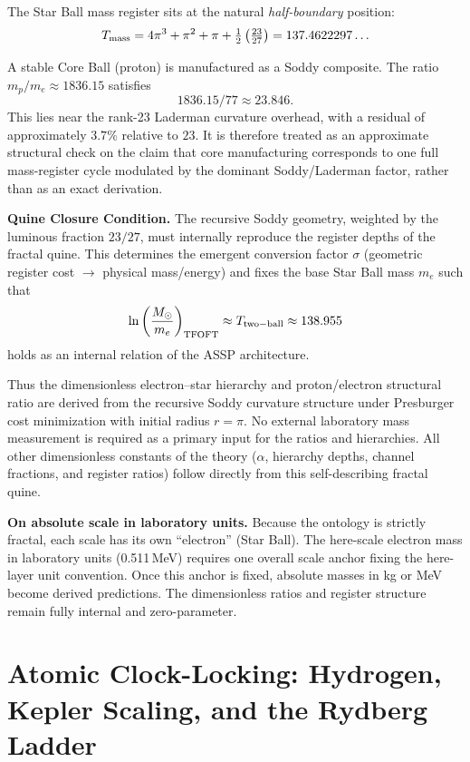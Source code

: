 \documentclass[11pt,a4paper]{article}
\begin{document}
The Star Ball mass register sits at the natural \emph{half-boundary} position:
\[
T_{\rm mass} = 4\pi^3 + \pi^2 + \pi + \tfrac12 \left( \tfrac{23}{27} \right) = 137.4622297\ldots
\]

A stable Core Ball (proton) is manufactured as a Soddy composite. The ratio \(m_p / m_e \approx 1836.15\) satisfies
\[
1836.15 / 77 \approx 23.846.
\]
This lies near the rank-23 Laderman curvature overhead, with a residual of approximately \(3.7\%\) relative to \(23\). It is therefore treated as an approximate structural check on the claim that core manufacturing corresponds to one full mass-register cycle modulated by the dominant Soddy/Laderman factor, rather than as an exact derivation.

\textbf{Quine Closure Condition.} 
The recursive Soddy geometry, weighted by the luminous fraction \(23/27\), must internally reproduce the register depths of the fractal quine. This determines the emergent conversion factor \(\sigma\) (geometric register cost \(\to\) physical mass/energy) and fixes the base Star Ball mass \(m_e\) such that
\[
\ln\left(\frac{M_\odot}{m_e}\right)_{\rm TFOFT} \approx T_{\rm two-ball} \approx 138.955
\]
holds as an internal relation of the ASSP architecture.

Thus the dimensionless electron--star hierarchy and proton/electron structural ratio are derived from the recursive Soddy curvature structure under Presburger cost minimization with initial radius \(r = \pi\). No external laboratory mass measurement is required as a primary input for the ratios and hierarchies. All other dimensionless constants of the theory (\(\alpha\), hierarchy depths, channel fractions, and register ratios) follow directly from this self-describing fractal quine.

\textbf{On absolute scale in laboratory units.} 
Because the ontology is strictly fractal, each scale has its own ``electron'' (Star Ball). The here-scale electron mass in laboratory units (0.511\,MeV) requires one overall scale anchor fixing the here-layer unit convention. Once this anchor is fixed, absolute masses in kg or MeV become derived predictions. The dimensionless ratios and register structure remain fully internal and zero-parameter.



\section{Atomic Clock-Locking: Hydrogen, Kepler Scaling, and the Rydberg Ladder}
\end{document}
